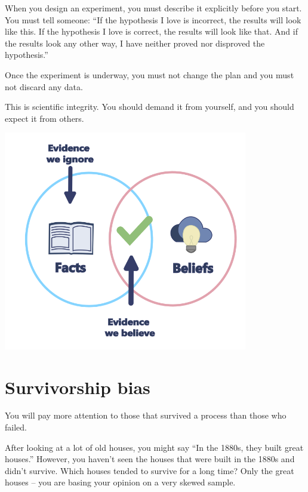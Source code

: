 When you design an experiment, you must describe it explicitly before
you start. You must tell someone: ``If the hypothesis I love is
incorrect, the results will look like this.  If the hypothesis I love
is correct, the results will look like that. And if the results look
any other way, I have neither proved nor disproved the hypothesis.''

Once the experiment is underway, you must not change the plan and you
must not discard any data.

This is scientific integrity. You should demand it from yourself, and
you should expect it from others.

\includegraphics[width=0.8\textwidth]{bias_CB.png}


\section{Survivorship bias}

You will pay more attention to those that survived a process than
those who failed.

After looking at a lot of old houses, you might say ``In the 1880s,
they built great houses.'' However, you haven't seen the houses that
were built in the 1880s and didn't survive. Which houses tended to
survive for a long time? Only the great houses -- you are
basing your opinion on a very skewed sample.

